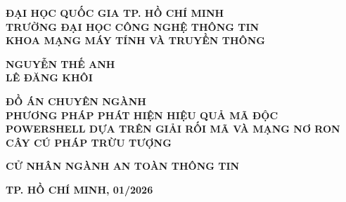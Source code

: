 \begin{titlepage}
    
    
    \begin{center}
        {\large\textbf{ ĐẠI HỌC QUỐC GIA TP. HỒ CHÍ MINH \\TRƯỜNG ĐẠI HỌC CÔNG NGHỆ THÔNG TIN \\ KHOA MẠNG MÁY TÍNH VÀ TRUYỀN THÔNG }\par}
    \end{center}
    
    \vspace*{40pt}

    \begingroup
    \setlength{\tabcolsep}{15pt}
    \begin{center}
    \large
        \textbf{NGUYỄN THẾ ANH} \\
        \textbf{LÊ ĐĂNG KHÔI}
    \end{center}
    \endgroup

    \vspace*{40pt}
    
    \begin{center}
        \Large\textbf{ĐỒ ÁN CHUYÊN NGÀNH} \\
        \vspace*{5pt}
        \Large\textbf{PHƯƠNG PHÁP PHÁT HIỆN HIỆU QUẢ MÃ ĐỘC POWERSHELL DỰA TRÊN GIẢI RỐI MÃ VÀ MẠNG NƠ RON CÂY CÚ PHÁP TRỪU TƯỢNG } \\
        \vspace*{5pt}
        \large\textbf{\color{red}{A deobfuscation and AST neural network enabled effective detection method for malicious PowerShell Scripts}}
    \end{center}

    \vspace*{40pt}
    \begin{center}
        \large\textbf{CỬ NHÂN NGÀNH AN TOÀN THÔNG TIN}
    \end{center}
    
    \vspace*{\fill}
    \begin{center}
        \textbf{TP. HỒ CHÍ MINH, 01/2026}
    \end{center}
\end{titlepage}

% 